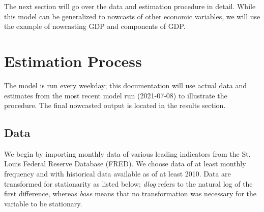 \documentclass[11pt, letterpaper]{article}\usepackage[]{graphicx}\usepackage[]{color}
\begin{document}
The next section will go over the data and estimation procedure in detail. While this model can be generalized to nowcasts of other economic variables, we will use the example of nowcasting GDP and components of GDP.

\newpage
\section{Estimation Process}
The model is run every weekday; this documentation will use actual data and estimates from the most recent model run (2021-07-08) to illustrate the procedure. The final nowcasted output is located in the results section.

\subsection{Data}
We begin by importing monthly data of various leading indicators from the St. Louis Federal Reserve Database (FRED). We choose data of at least monthly frequency and with historical data available as of at least 2010. Data are transformed for stationarity as listed below; \textit{dlog} refers to the natural log of the first difference, whereas \textit{base} means that no transformation was necessary for the variable to be stationary.
\end{document}
